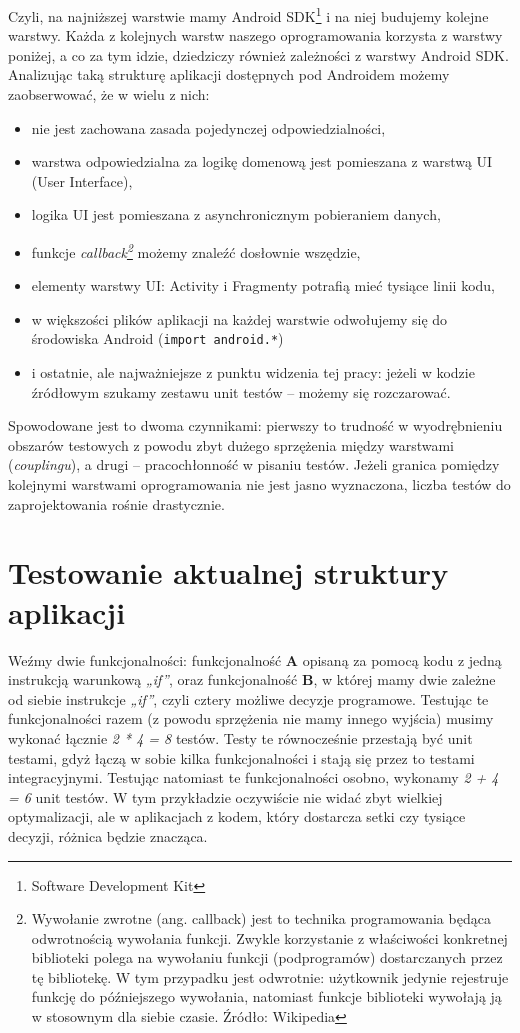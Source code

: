 Czyli, na najniższej warstwie mamy Android SDK\footnote{Software Development Kit}  i na niej budujemy kolejne warstwy. Każda z kolejnych warstw naszego oprogramowania korzysta z warstwy poniżej, a co za tym idzie, dziedziczy również zależności z warstwy Android SDK. Analizując taką strukturę aplikacji dostępnych pod Androidem możemy zaobserwować, że w wielu z nich:
\begin{itemize}
\item
nie jest zachowana zasada pojedynczej odpowiedzialności,
\item
warstwa odpowiedzialna za logikę domenową jest pomieszana z warstwą UI (User Interface),
\item
logika UI jest pomieszana z asynchronicznym pobieraniem danych,
\item
funkcje \textit{callback\footnote{Wywołanie zwrotne (ang. callback) jest to technika programowania będąca odwrotnością wywołania funkcji. Zwykle korzystanie z właściwości konkretnej biblioteki polega na wywołaniu funkcji (podprogramów) dostarczanych przez tę bibliotekę. W tym przypadku jest odwrotnie: użytkownik jedynie rejestruje funkcję do późniejszego wywołania, natomiast funkcje biblioteki wywołają ją w stosownym dla siebie czasie. Źródło: Wikipedia}} możemy znaleźć dosłownie wszędzie,
\item
elementy warstwy UI: Activity i Fragmenty potrafią mieć tysiące linii kodu,
\item
w większości plików aplikacji na każdej warstwie odwołujemy się do środowiska Android (\texttt{import android.*})
\item
i ostatnie, ale najważniejsze z punktu widzenia tej pracy: jeżeli w kodzie źródłowym szukamy zestawu unit testów – możemy się rozczarować.
\end{itemize}

Spowodowane jest to dwoma czynnikami: pierwszy to trudność w wyodrębnieniu obszarów testowych z powodu zbyt dużego sprzężenia między warstwami (\textit{couplingu}), a drugi – pracochłonność w pisaniu testów. Jeżeli granica pomiędzy kolejnymi warstwami oprogramowania nie jest jasno wyznaczona, liczba testów do zaprojektowania rośnie drastycznie.

\section{Testowanie aktualnej struktury aplikacji}
\label{testowanie_starej_struktury}

Weźmy dwie funkcjonalności: funkcjonalność \textbf{A} opisaną za pomocą kodu z jedną instrukcją warunkową \textit{„if”}, oraz funkcjonalność \textbf{B}, w której mamy dwie zależne od siebie instrukcje \textit{„if”}, czyli cztery możliwe decyzje programowe. Testując te funkcjonalności razem (z powodu sprzężenia nie mamy innego wyjścia) musimy wykonać łącznie \textit{2 * 4 = 8} testów. Testy te równocześnie przestają być unit testami, gdyż łączą w sobie kilka funkcjonalności i stają się przez to testami integracyjnymi. Testując natomiast te funkcjonalności osobno, wykonamy \textit{2 + 4 = 6} unit testów. W tym przykładzie oczywiście nie widać zbyt wielkiej optymalizacji, ale w aplikacjach z kodem, który dostarcza setki czy tysiące decyzji, różnica będzie znacząca.

